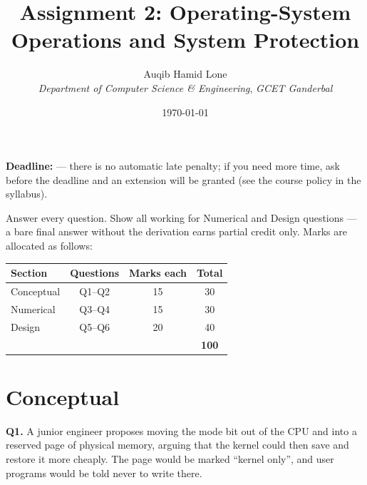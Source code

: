 \documentclass[11pt]{article}
\title{Assignment 2: Operating-System Operations and System Protection}
\author{Auqib Hamid Lone\\[0.3em]
  \emph{Department of Computer Science \& Engineering}, \emph{GCET Ganderbal}}
\date{\today}
\begin{document}
\maketitle

\noindent\textbf{Deadline:}  --- there is no automatic late penalty; if you need more time, ask before the deadline and an extension will be granted (see the course policy in the syllabus).

\noindent Answer every question. Show all working for Numerical and Design questions --- a bare final answer without the derivation earns partial credit only. Marks are allocated as follows:

\begin{center}
\renewcommand{\arraystretch}{1.25}
\begin{tabular}{lccc}
\textbf{Section} & \textbf{Questions} & \textbf{Marks each} & \textbf{Total} \\
\hline
Conceptual & Q1--Q2 & 15 & 30 \\
Numerical  & Q3--Q4 & 15 & 30 \\
Design     & Q5--Q6 & 20 & 40 \\
\hline
           &         &      & \textbf{100} \\
\end{tabular}
\end{center}

\section{Conceptual}

\textbf{Q1.} A junior engineer proposes moving the mode bit out of the CPU and into a reserved page of physical memory, arguing that the kernel could then save and restore it more cheaply. The page would be marked ``kernel only'', and user programs would be told never to write there.
\end{document}
